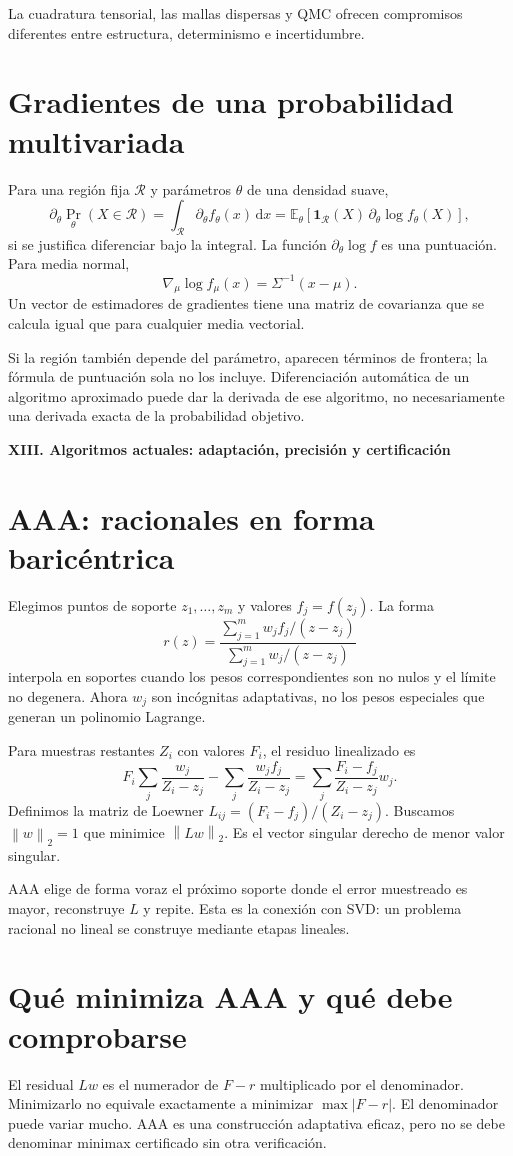 \documentclass[11pt,a4paper]{article}
\newcommand{\E}{\mathbb E}
\newcommand{\ind}{\mathbf 1}
\newcommand{\dd}{\,\mathrm d}
\newcommand{\norm}[1]{\left\lVert #1\right\rVert}
\theoremstyle{definition}
\newcommand{\parte}[1]{\par\bigskip\Needspace{8\baselineskip}\begin{center}{\Large\bfseries\color{azul}#1}\end{center}}
\newcounter{problema}
\begin{document}
La cuadratura tensorial, las mallas dispersas y QMC ofrecen compromisos diferentes entre estructura, determinismo e incertidumbre.

\section{Gradientes de una probabilidad multivariada}
Para una región fija $\mathcal R$ y parámetros $\theta$ de una densidad suave,
\[
\partial_\theta\Pr_\theta(X\in\mathcal R)
=\int_{\mathcal R}\partial_\theta f_\theta(x)\dd x
=\E_\theta[\ind_{\mathcal R}(X)\,\partial_\theta\log f_\theta(X)],
\]
si se justifica diferenciar bajo la integral. La función $\partial_\theta\log f$ es una puntuación. Para media normal,
\[
\nabla_\mu\log f_\mu(x)=\Sigma^{-1}(x-\mu).
\]
Un vector de estimadores de gradientes tiene una matriz de covarianza que se calcula igual que para cualquier media vectorial.

Si la región también depende del parámetro, aparecen términos de frontera; la fórmula de puntuación sola no los incluye. Diferenciación automática de un algoritmo aproximado puede dar la derivada de ese algoritmo, no necesariamente una derivada exacta de la probabilidad objetivo.


\parte{XIII. Algoritmos actuales: adaptación, precisión y certificación}
\section{AAA: racionales en forma baricéntrica}
Elegimos puntos de soporte $z_1,\ldots,z_m$ y valores $f_j=f(z_j)$. La forma
\[
r(z)=\frac{\sum_{j=1}^m w_jf_j/(z-z_j)}
{\sum_{j=1}^m w_j/(z-z_j)}
\]
interpola en soportes cuando los pesos correspondientes son no nulos y el límite no degenera. Ahora $w_j$ son incógnitas adaptativas, no los pesos especiales que generan un polinomio Lagrange.

Para muestras restantes $Z_i$ con valores $F_i$, el residuo linealizado es
\[
F_i\sum_j\frac{w_j}{Z_i-z_j}
-\sum_j\frac{w_jf_j}{Z_i-z_j}
=\sum_j\frac{F_i-f_j}{Z_i-z_j}w_j.
\]
Definimos la matriz de Loewner
$L_{ij}=(F_i-f_j)/(Z_i-z_j)$. Buscamos $\norm w_2=1$ que minimice $\norm{Lw}_2$. Es el vector singular derecho de menor valor singular.

AAA elige de forma voraz el próximo soporte donde el error muestreado es mayor, reconstruye $L$ y repite. Esta es la conexión con SVD: un problema racional no lineal se construye mediante etapas lineales.

\section{Qué minimiza AAA y qué debe comprobarse}
El residual $Lw$ es el numerador de $F-r$ multiplicado por el denominador. Minimizarlo no equivale exactamente a minimizar $\max|F-r|$. El denominador puede variar mucho. AAA es una construcción adaptativa eficaz, pero no se debe denominar minimax certificado sin otra verificación.
\end{document}
